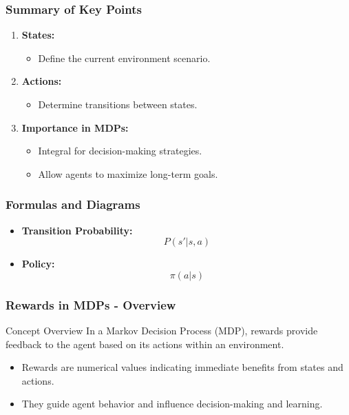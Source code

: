 \documentclass[aspectratio=169]{beamer}
\begin{document}
\begin{frame}[fragile]
    \frametitle{Summary of Key Points}
    \begin{enumerate}
        \item \textbf{States:}
            \begin{itemize}
                \item Define the current environment scenario.
            \end{itemize}
        \item \textbf{Actions:}
            \begin{itemize}
                \item Determine transitions between states.
            \end{itemize}
        \item \textbf{Importance in MDPs:}
            \begin{itemize}
                \item Integral for decision-making strategies.
                \item Allow agents to maximize long-term goals.
            \end{itemize}
    \end{enumerate}
\end{frame}

\begin{frame}[fragile]
    \frametitle{Formulas and Diagrams}
    \begin{itemize}
        \item \textbf{Transition Probability:} 
        \begin{equation}
            P(s'|s,a)
        \end{equation}
        \item \textbf{Policy:} 
        \begin{equation}
            \pi(a|s)
        \end{equation}
    \end{itemize}
\end{frame}

\begin{frame}[fragile]
    \frametitle{Rewards in MDPs - Overview}
    \begin{block}{Concept Overview}
        In a Markov Decision Process (MDP), rewards provide feedback to the agent based on its actions within an environment. 
    \end{block}
    \begin{itemize}
        \item Rewards are numerical values indicating immediate benefits from states and actions.
        \item They guide agent behavior and influence decision-making and learning.
    \end{itemize}
\end{frame}
\end{document}
